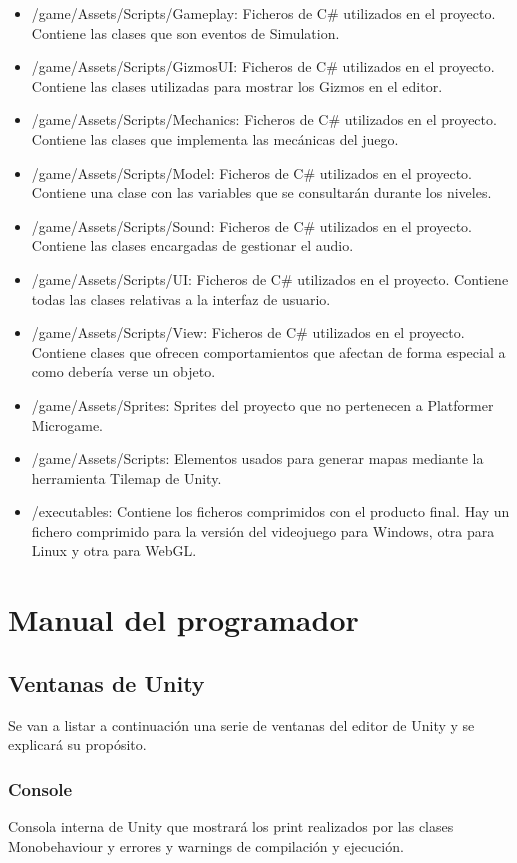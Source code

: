 \begin{itemize}
\item
/game/Assets/Scripts/Gameplay: Ficheros de C\# utilizados en el proyecto. Contiene las clases que son eventos de Simulation.
\item
/game/Assets/Scripts/GizmosUI: Ficheros de C\# utilizados en el proyecto. Contiene las clases utilizadas para mostrar los Gizmos en el editor.
\item
/game/Assets/Scripts/Mechanics: Ficheros de C\# utilizados en el proyecto. Contiene las clases que implementa las mecánicas del juego.
\item
/game/Assets/Scripts/Model: Ficheros de C\# utilizados en el proyecto. Contiene una clase con las variables que se consultarán durante los niveles.
\item
/game/Assets/Scripts/Sound: Ficheros de C\# utilizados en el proyecto. Contiene las clases encargadas de gestionar el audio.
\item
/game/Assets/Scripts/UI: Ficheros de C\# utilizados en el proyecto. Contiene todas las clases relativas a la interfaz de usuario.
\item
/game/Assets/Scripts/View: Ficheros de C\# utilizados en el proyecto. Contiene clases que ofrecen comportamientos que afectan de forma especial a como debería verse un objeto.
\item
/game/Assets/Sprites: Sprites del proyecto que no pertenecen a Platformer Microgame.
\item
/game/Assets/Scripts: Elementos usados para generar mapas mediante la herramienta Tilemap de Unity.
\item
/executables: Contiene los ficheros comprimidos con el producto final. Hay un fichero comprimido para la versión del videojuego para Windows, otra para Linux y otra para WebGL.
\end{itemize}

\section{Manual del programador}
\subsection{Ventanas de Unity}
Se van a listar a continuación una serie de ventanas del editor de Unity y se explicará su propósito.

\subsubsection{Console}
Consola interna de Unity que mostrará los print realizados por las clases Monobehaviour y errores y warnings de compilación y ejecución.


